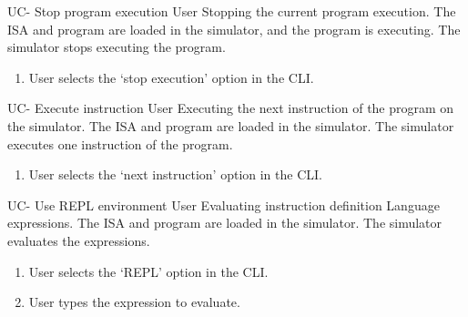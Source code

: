 \begin{useCase}{UC-}
  {Stop program execution}  %
  {User}  %
  {Stopping the current program execution.}  %
  {The \gls{ISA} and program are loaded in the simulator, and the program is executing.}  %
  {The simulator stops executing the program.}  %
  \begin{enumerate}[leftmargin=*, topsep=0pt, noitemsep]  %
    \item User selects the `stop execution' option in the \gls{CLI}.
  \end{enumerate}
\end{useCase}

\begin{useCase}{UC-}
  {Execute instruction}  %
  {User}  %
  {Executing the next instruction of the program on the simulator.}  %
  {The \gls{ISA} and program are loaded in the simulator.}  %
  {The simulator executes one instruction of the program.}  %
  \begin{enumerate}[leftmargin=*, topsep=0pt, noitemsep]  %
    \item User selects the `next instruction' option in the \gls{CLI}.
  \end{enumerate}
\end{useCase}

\begin{useCase}{UC-}
  {Use \gls{REPL environment}}  %
  {User}  %
  {Evaluating instruction definition Language expressions.}  %
  {The \gls{ISA} and program are loaded in the simulator.}  %
  {The simulator evaluates the expressions.}  %
  \begin{enumerate}[leftmargin=*, topsep=0pt, noitemsep]  %
    \item User selects the `REPL' option in the \gls{CLI}.
    \item User types the expression to evaluate.
  \end{enumerate}
\end{useCase}


